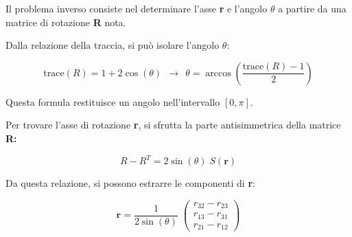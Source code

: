 \documentclass[11pt, a4paper]{article}
\begin{document}

\begin{par}
\begin{flushleft}
Il problema inverso consiste nel determinare l'asse \textbf{r }e l'angolo $\theta$ a partire da una matrice di rotazione \textbf{R }nota.
\end{flushleft}
\end{par}

\begin{par}
\begin{flushleft}
Dalla relazione della traccia, si può isolare l'angolo $\theta$:
\end{flushleft}
\end{par}

\begin{par}
$$\textrm{trace}(R)=1+2\cos (\theta )~~\longrightarrow ~~\theta =\arccos \left(\frac{\textrm{trace}(R)-1}{2}\right)$$
\end{par}

\begin{par}
\begin{flushleft}
Questa formula restituisce un angolo nell'intervallo $[0,\pi ]$.
\end{flushleft}
\end{par}

\begin{par}
\begin{flushleft}
Per trovare l'asse di rotazione \textbf{r}, si sfrutta la parte antisimmetrica della matrice \textbf{R:}
\end{flushleft}
\end{par}

\begin{par}
$$R-R^T =2\sin (\theta )\;S(\mathbf{r})$$
\end{par}

\begin{par}
\begin{flushleft}

Da questa relazione, si possono estrarre le componenti di \textbf{r}:
\end{flushleft}
\end{par}

\begin{par}
$$\mathbf{r}=\frac{1}{2\sin (\theta )}\;\left(\begin{array}{c}
r_{32} -r_{23} \\
r_{13} -r_{31} \\
r_{21} -r_{12}
\end{array}\right)$$
\end{par}
\end{document}
